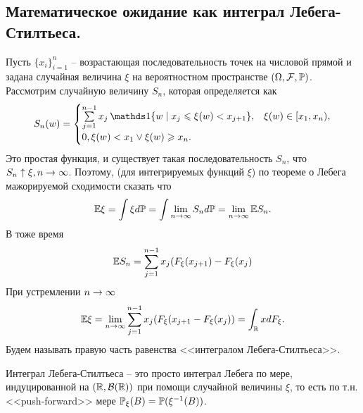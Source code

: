 \subsection{Математическое ожидание как интеграл Лебега-Стилтьеса.}
Пусть $\{x_i\}_{i = 1}^n$ -- возрастающая последовательность точек на числовой прямой и задана случайная величина $\xi$ на вероятностном пространстве $(\Omega, \mathcal{F}, \P)$. Рассмотрим случайную величину $S_n$, которая определяется как 
\[
    S_n(w) = \begin{cases}
        \sum\limits_{j = 1}^{n - 1} x_j\Ind\{w \mid x_j \leq \xi(w) < x_{j + 1} \}, & \xi(w) \in [x_1, x_n), \\
        0, \xi(w) < x_1 \vee \xi(w) \geq x_{n}.
    \end{cases} 
\]
Это простая функция, и существует такая последовательность $S_n$, что $S_n \uparrow \xi, n \ra \infty$. Поэтому, (для интегрируемых функций $\xi$) по теореме о Лебега мажорируемой сходимости сказать что
\[
    \Ex \xi = \int \xi d\P = \int \lim\limits_{n \ra \infty} S_n d\P = \lim\limits_{n \ra \infty} \Ex S_n.
\]
В тоже время
\[
    \Ex S_n = \sum\limits_{j = 1}^{n - 1} x_j(F_{\xi}(x_{j + 1}) - F_{\xi}(x_j)
\]
При устремлении $n \ra \infty$ 
\[
    \Ex \xi = \lim\limits_{n \ra \infty} \sum\limits_{j = 1}^{n - 1} x_j(F_\xi(x_{j + 1} - F_\xi(x_j)) = \int_{\R} xdF_\xi.
\]
Будем называть правую часть равенства <<интегралом Лебега-Стилтьеса>>. 
\begin{note}
    Интеграл Лебега-Стилтьеса -- это просто интеграл Лебега по мере, индуцированной на $(\R, \mathcal{B}(\R))$ при помощи случайной величины $\xi$, то есть по т.н. <<push-forward>> мере $\P_\xi(B) = \P(\xi^{-1}(B))$.
\end{note}
